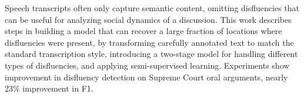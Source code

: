 Speech transcripts often only capture semantic content, omitting disfluencies that can be useful for analyzing social dynamics of a discussion. This work describes steps in building a model that can recover a large fraction of locations where disfluencies were present, by transforming carefully annotated text to match the standard transcription style, introducing a two-stage model for handling different types of disfluencies, and applying semi-supervised learning. Experiments show improvement in disfluency detection on Supreme Court oral arguments, nearly 23\% improvement in F1.
